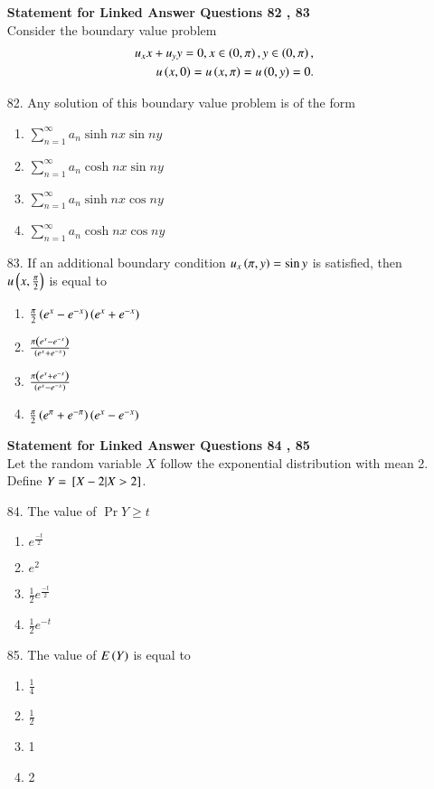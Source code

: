\documentclass[journal,12pt,onecolumn]{IEEEtran}
\theoremstyle{remark}
\begin{document}
\begin{enumerate}
\textbf{Statement for Linked Answer Questions 82 , 83}\\
Consider the boundary value problem
\begin{align}
    u_xx + u_yy = 0, x \in \left(0, \pi\right), y \in \left(0, \pi\right), \\
    u\left(x, 0\right) = u\left(x, \pi\right) = u\left(0, y\right) = 0.
\end{align}
\item[82.] Any solution of this boundary value problem is of the form
		\hfill{}
		\begin{enumerate}
            \item $\sum_{n = 1}^{\infty} a_n \sinh nx \sin ny$ 
            \item $\sum_{n = 1}^{\infty} a_n \cosh nx \sin ny$ 
			\item $\sum_{n = 1}^{\infty} a_n \sinh nx \cos ny$ 
		\item $\sum_{n = 1}^{\infty} a_n \cosh nx \cos ny$ 
		\end{enumerate}
\item[83.] If an additional boundary condition $u_x\left(\pi, y\right) = \sin y$ is satisfied, then 
    $u\left(x, \frac{\pi}{2}\right)$ is equal to
		\hfill{}
		\begin{enumerate}
            \item $\frac{\pi}{2}\left(e^x - e^{-x}\right)\left(e^x + e^{-x}\right)$ 
            \item $\frac{\pi\left(e^x - e^{-x}\right)}{\left(e^x + e^{-x}\right)}$ 
            \item $\frac{\pi\left(e^x + e^{-x}\right)}{\left(e^x - e^{-x}\right)}$ 
            \item $\frac{\pi}{2}\left(e^{\pi} + e^{-\pi}\right)\left(e^x - e^{-x}\right)$ 
		\end{enumerate}
\textbf{Statement for Linked Answer Questions 84 , 85}\\
Let the random variable $X$ follow the exponential distribution with mean 2. Define
$Y = {}\left[X - 2 | X > 2\right]$.
\item[84.] The value of $\Pr{Y \ge t}$
		\hfill{}
		\begin{enumerate}
            \item $e ^ {\frac{-t}{2}}$ 
            \item $e ^ {2}$ 
            \item $\frac{1}{2}e ^ {\frac{-t}{2}}$ 
            \item $\frac{1}{2}e ^ {-t}$ 
		\end{enumerate}
\item[85.] The value of $E\left(Y\right)$ is equal to
		\hfill{}
		\begin{enumerate}
            \item $\frac{1}{4}$ 
            \item $\frac{1}{2}$ 
            \item 1
            \item 2
		\end{enumerate}

\end{enumerate}
\end{document}
